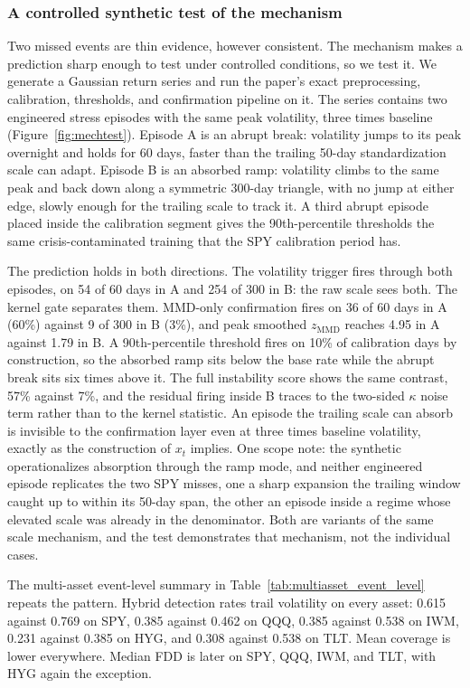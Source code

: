 \documentclass[pdflatex,sn-mathphys-num,iicol]{sn-jnl}
\begin{document}
\subsubsection{A controlled synthetic test of the mechanism}
\label{sec:mechtest}
Two missed events are thin evidence, however consistent. The mechanism makes a prediction sharp enough to test under controlled conditions, so we test it. We generate a Gaussian return series and run the paper's exact preprocessing, calibration, thresholds, and confirmation pipeline on it. The series contains two engineered stress episodes with the same peak volatility, three times baseline (Figure~\ref{fig:mechtest}). Episode A is an abrupt break: volatility jumps to its peak overnight and holds for 60 days, faster than the trailing 50-day standardization scale can adapt. Episode B is an absorbed ramp: volatility climbs to the same peak and back down along a symmetric 300-day triangle, with no jump at either edge, slowly enough for the trailing scale to track it. A third abrupt episode placed inside the calibration segment gives the 90th-percentile thresholds the same crisis-contaminated training that the SPY calibration period has.

The prediction holds in both directions. The volatility trigger fires through both episodes, on 54 of 60 days in A and 254 of 300 in B: the raw scale sees both. The kernel gate separates them. MMD-only confirmation fires on 36 of 60 days in A (60\%) against 9 of 300 in B (3\%), and peak smoothed $z_{\mathrm{MMD}}$ reaches 4.95 in A against 1.79 in B. A 90th-percentile threshold fires on 10\% of calibration days by construction, so the absorbed ramp sits below the base rate while the abrupt break sits six times above it. The full instability score shows the same contrast, 57\% against 7\%, and the residual firing inside B traces to the two-sided $\kappa$ noise term rather than to the kernel statistic. An episode the trailing scale can absorb is invisible to the confirmation layer even at three times baseline volatility, exactly as the construction of $x_t$ implies. One scope note: the synthetic operationalizes absorption through the ramp mode, and neither engineered episode replicates the two SPY misses, one a sharp expansion the trailing window caught up to within its 50-day span, the other an episode inside a regime whose elevated scale was already in the denominator. Both are variants of the same scale mechanism, and the test demonstrates that mechanism, not the individual cases.


The multi-asset event-level summary in Table~\ref{tab:multiasset_event_level} repeats the pattern. Hybrid detection rates trail volatility on every asset: 0.615 against 0.769 on SPY, 0.385 against 0.462 on QQQ, 0.385 against 0.538 on IWM, 0.231 against 0.385 on HYG, and 0.308 against 0.538 on TLT. Mean coverage is lower everywhere. Median FDD is later on SPY, QQQ, IWM, and TLT, with HYG again the exception.
\end{document}
